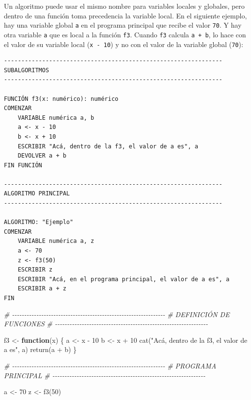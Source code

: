 \documentclass[
]{book}
\newenvironment{Shaded}{\begin{snugshade}}{\end{snugshade}}
\newcommand{\CommentTok}[1]{\textcolor[rgb]{0.56,0.35,0.01}{\textit{#1}}}
\newcommand{\ControlFlowTok}[1]{\textcolor[rgb]{0.13,0.29,0.53}{\textbf{#1}}}
\newcommand{\DecValTok}[1]{\textcolor[rgb]{0.00,0.00,0.81}{#1}}
\newcommand{\FunctionTok}[1]{\textcolor[rgb]{0.00,0.00,0.00}{#1}}
\newcommand{\NormalTok}[1]{#1}
\newcommand{\OtherTok}[1]{\textcolor[rgb]{0.56,0.35,0.01}{#1}}
\newcommand{\SpecialCharTok}[1]{\textcolor[rgb]{0.00,0.00,0.00}{#1}}
\newcommand{\StringTok}[1]{\textcolor[rgb]{0.31,0.60,0.02}{#1}}
\begin{document}
Un algoritmo puede usar el mismo nombre para variables locales y globales, pero dentro de una función toma precedencia la variable local. En el siguiente ejemplo, hay una variable global \texttt{a} en el programa principal que recibe el valor \texttt{70}. Y hay otra variable \texttt{a} que es local a la función \texttt{f3}. Cuando \texttt{f3} calcula \texttt{a\ +\ b}, lo hace con el valor de su variable local (\texttt{x\ -\ 10}) y no con el valor de la variable global (\texttt{70}):

\begin{verbatim}
---------------------------------------------------------------
SUBALGORITMOS
---------------------------------------------------------------

FUNCIÓN f3(x: numérico): numérico
COMENZAR
    VARIABLE numérica a, b
    a <- x - 10
    b <- x + 10
    ESCRIBIR "Acá, dentro de la f3, el valor de a es", a
    DEVOLVER a + b
FIN FUNCIÓN

---------------------------------------------------------------
ALGORITMO PRINCIPAL
---------------------------------------------------------------

ALGORITMO: "Ejemplo"
COMENZAR
    VARIABLE numérica a, z
    a <- 70
    z <- f3(50)
    ESCRIBIR z
    ESCRIBIR "Acá, en el programa principal, el valor de a es", a
    ESCRIBIR a + z
FIN
\end{verbatim}

\begin{Shaded}
\begin{Highlighting}[]
\CommentTok{\# {-}{-}{-}{-}{-}{-}{-}{-}{-}{-}{-}{-}{-}{-}{-}{-}{-}{-}{-}{-}{-}{-}{-}{-}{-}{-}{-}{-}{-}{-}{-}{-}{-}{-}{-}{-}{-}{-}{-}{-}{-}{-}{-}{-}{-}{-}{-}{-}{-}{-}{-}{-}{-}{-}{-}{-}{-}{-}{-}{-}{-}{-}{-}}
\CommentTok{\# DEFINICIÓN DE FUNCIONES}
\CommentTok{\# {-}{-}{-}{-}{-}{-}{-}{-}{-}{-}{-}{-}{-}{-}{-}{-}{-}{-}{-}{-}{-}{-}{-}{-}{-}{-}{-}{-}{-}{-}{-}{-}{-}{-}{-}{-}{-}{-}{-}{-}{-}{-}{-}{-}{-}{-}{-}{-}{-}{-}{-}{-}{-}{-}{-}{-}{-}{-}{-}{-}{-}{-}{-}}

\NormalTok{f3 }\OtherTok{\textless{}{-}} \ControlFlowTok{function}\NormalTok{(x) \{}
\NormalTok{    a }\OtherTok{\textless{}{-}}\NormalTok{ x }\SpecialCharTok{{-}} \DecValTok{10}
\NormalTok{    b }\OtherTok{\textless{}{-}}\NormalTok{ x }\SpecialCharTok{+} \DecValTok{10}
    \FunctionTok{cat}\NormalTok{(}\StringTok{"Acá, dentro de la f3, el valor de a es"}\NormalTok{, a)}
    \FunctionTok{return}\NormalTok{(a }\SpecialCharTok{+}\NormalTok{ b)}
\NormalTok{\}}

\CommentTok{\# {-}{-}{-}{-}{-}{-}{-}{-}{-}{-}{-}{-}{-}{-}{-}{-}{-}{-}{-}{-}{-}{-}{-}{-}{-}{-}{-}{-}{-}{-}{-}{-}{-}{-}{-}{-}{-}{-}{-}{-}{-}{-}{-}{-}{-}{-}{-}{-}{-}{-}{-}{-}{-}{-}{-}{-}{-}{-}{-}{-}{-}{-}{-}}
\CommentTok{\# PROGRAMA PRINCIPAL}
\CommentTok{\# {-}{-}{-}{-}{-}{-}{-}{-}{-}{-}{-}{-}{-}{-}{-}{-}{-}{-}{-}{-}{-}{-}{-}{-}{-}{-}{-}{-}{-}{-}{-}{-}{-}{-}{-}{-}{-}{-}{-}{-}{-}{-}{-}{-}{-}{-}{-}{-}{-}{-}{-}{-}{-}{-}{-}{-}{-}{-}{-}{-}{-}{-}{-}}

\NormalTok{a }\OtherTok{\textless{}{-}} \DecValTok{70}
\NormalTok{z }\OtherTok{\textless{}{-}} \FunctionTok{f3}\NormalTok{(}\DecValTok{50}\NormalTok{)}
\end{Highlighting}
\end{Shaded}
\end{document}

